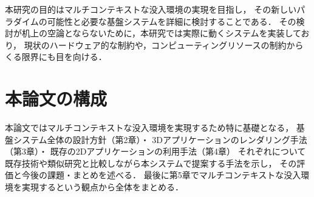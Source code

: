 本研究の目的はマルチコンテキストな没入環境の実現を目指し，
その新しいパラダイムの可能性と必要な基盤システムを詳細に検討することである．
その検討が机上の空論とならないために，本研究では実際に動くシステムを実装しており，
現状のハードウェア的な制約や，コンピューティングリソースの制約からくる限界にも目を向ける．


\section{本論文の構成}

本論文ではマルチコンテキストな没入環境を実現するため特に基礎となる，
基盤システム全体の設計方針（第2章）・
3Dアプリケーションのレンダリング手法（第3章）・
既存の2Dアプリケーションの利用手法（第4章）
それぞれについて既存技術や類似研究と比較しながら本システムで提案する手法を示し，
その評価と今後の課題・まとめを述べる．
最後に第5章でマルチコンテキストな没入環境を実現するという観点から全体をまとめる．
